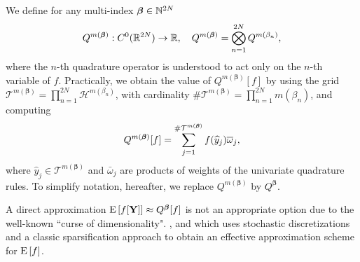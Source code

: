 We define for any multi-index $\boldsymbol{\beta} \in \mathbb{N}^{2N}$
$$Q^{m(\boldsymbol{\beta})}: C^0(\mathbb{R}^{2N}) \rightarrow \mathbb{R},\quad  Q^{m(\boldsymbol{\beta})}= \bigotimes_{n = 1}^{2N} Q^{m(\beta_n)} , $$
where the $n$-th quadrature operator is understood to act only on the $n$-th variable of $f$. Practically, we obtain the value of $Q^{m(\boldsymbol{\beta})}[f]$  by using the grid $\mathcal{T}^{m(\boldsymbol{\beta})}= \prod_{n = 1}^{2N}  \mathcal{H}^{m(\beta_n)}$, with cardinality $\#\mathcal{T}^{m(\boldsymbol{\beta})}=\prod_{n=1}^{2N} m (\beta_n)$, and computing
$$ Q^{m(\boldsymbol{\beta})}[f]= \sum_{j=1}^{\#\mathcal{T}^{m(\boldsymbol{\beta})}} f(\widehat{y}_j) \overline{\omega}_j ,$$
where $\hat{y}_j \in \mathcal{T}^{m(\boldsymbol{\beta})}$ and $\bar{\omega}_j$ are  products of weights of the univariate quadrature rules. To simplify notation, hereafter, we replace  $Q^{m(\boldsymbol{\beta})}$ by $Q^{\boldsymbol{\beta}}$.

A direct approximation $\mathrm{E}\left[f[\mathbf{Y}]\right] \approx Q^{\boldsymbol{\beta}}[f]$ is not an appropriate option  due to the well-known ``curse of dimensionality". , and which uses  stochastic discretizations  and a classic sparsification approach to obtain an effective approximation scheme for $\mathrm{E}\left[f\right]$. 

